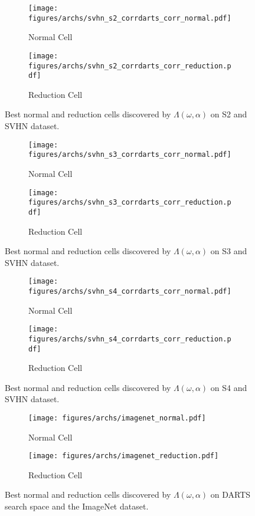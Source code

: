 \documentclass{article} \usepackage{fancyhdr, iclr2023_conference, times}
\begin{document}
\begin{figure}[h]
    \centering
    \begin{subfigure}[h]{0.5\textwidth}
        \centering
        \texttt{[image: figures/archs/svhn\_s2\_corrdarts\_corr\_normal.pdf]}
        \caption{Normal Cell}
    \end{subfigure}\begin{subfigure}[h]{0.5\textwidth}
        \centering
        \texttt{[image: figures/archs/svhn\_s2\_corrdarts\_corr\_reduction.pdf]}
        \caption{Reduction Cell}
    \end{subfigure}
    \caption{Best normal and reduction cells discovered by $\Lambda(\omega, \alpha)$ on S2 and SVHN dataset.}
\end{figure}
\begin{figure}[h]
    \centering
    \begin{subfigure}[h]{0.5\textwidth}
        \centering
        \texttt{[image: figures/archs/svhn\_s3\_corrdarts\_corr\_normal.pdf]}
        \caption{Normal Cell}
    \end{subfigure}\begin{subfigure}[h]{0.5\textwidth}
        \centering
        \texttt{[image: figures/archs/svhn\_s3\_corrdarts\_corr\_reduction.pdf]}
        \caption{Reduction Cell}
    \end{subfigure}
    \caption{Best normal and reduction cells discovered by $\Lambda(\omega, \alpha)$ on S3 and SVHN dataset.}
\end{figure}
\begin{figure}[h]
    \centering
    \begin{subfigure}[h]{0.5\textwidth}
        \centering
        \texttt{[image: figures/archs/svhn\_s4\_corrdarts\_corr\_normal.pdf]}
        \caption{Normal Cell}
    \end{subfigure}\begin{subfigure}[h]{0.5\textwidth}
        \centering
        \texttt{[image: figures/archs/svhn\_s4\_corrdarts\_corr\_reduction.pdf]}
        \caption{Reduction Cell}
    \end{subfigure}
    \caption{Best normal and reduction cells discovered by $\Lambda(\omega, \alpha)$ on S4 and SVHN dataset.}
\end{figure}
\begin{figure}[h]
    \centering
    \begin{subfigure}[h]{0.5\textwidth}
        \centering
        \texttt{[image: figures/archs/imagenet\_normal.pdf]}
        \caption{Normal Cell}
    \end{subfigure}\begin{subfigure}[h]{0.5\textwidth}
        \centering
        \texttt{[image: figures/archs/imagenet\_reduction.pdf]}
        \caption{Reduction Cell}
    \end{subfigure}
    \caption{Best normal and reduction cells discovered by $\Lambda(\omega, \alpha)$ on DARTS search space and the ImageNet dataset.}
    \label{fig:imagenet-cells}
\end{figure}
\end{document}
